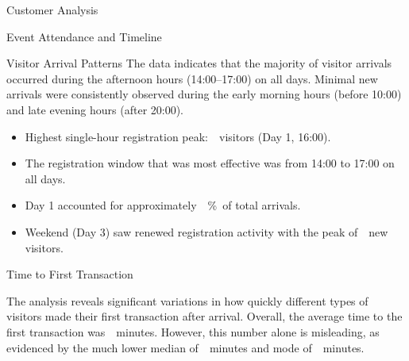\begin{section}{Customer Analysis}
\begin{subsection}{Event Attendance and Timeline}
\begin{subsubsection}{Visitor Arrival Patterns}
			The data indicates that the majority of visitor arrivals occurred during the afternoon hours (14:00–17:00) on all days.
			Minimal new arrivals were consistently observed during the early morning hours (before 10:00) and late evening hours (after 20:00).

			\begin{keytakeaways}
				\begin{itemize}
					\item Highest single-hour registration peak:~~visitors (Day 1, 16:00).
					\item The registration window that was most effective was from 14:00 to 17:00 on all days.
					\item Day 1 accounted for approximately~~\%~of total arrivals.
					\item Weekend (Day 3) saw renewed registration activity with the peak of~~new visitors.
				\end{itemize}
			\end{keytakeaways}
		\end{subsubsection}

		\begin{subsubsection}{Time to First Transaction}
			\label{subsubsec:analysis-first-transaction}


			The analysis reveals significant variations in how quickly different types of visitors made their first transaction after arrival.
			Overall, the average time to the first transaction was~~minutes.
			However, this number alone is misleading, as evidenced by the much lower median of~~minutes and mode of~~minutes.


\end{subsubsection}
\end{subsection}
\end{section}
